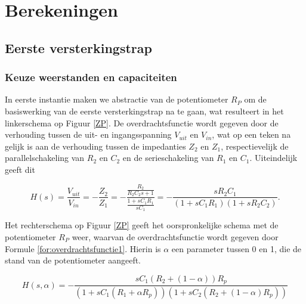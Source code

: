 \documentclass{report}
\begin{document}
\chapter{Berekeningen}
\label{berek}
\section{Eerste versterkingstrap}

\subsection{Keuze weerstanden en capaciteiten}

In eerste instantie maken we abstractie van de potentiometer $R_P$ om de basiswerking van de eerste versterkingstrap na te gaan, wat resulteert in het linkerschema op Figuur \ref{ZP}. De overdrachtsfunctie wordt gegeven door de verhouding tussen de uit- en ingangsspanning $V_{uit}$ en $V_{in}$, wat op een teken na gelijk is aan de verhouding tussen de impedanties $Z_2$ en $Z_1$,  respectievelijk de parallelschakeling van $R_2$ en $C_2$ en de serieschakeling van $R_1$ en $C_1$. Uiteindelijk geeft dit



\begin{equation}
    H(s) = \frac{V_{uit}}{V_{in}}= -\frac{Z_2}{Z_1} = -\frac{\frac{R_2}{R_2C_2s+1}}{\frac{1+sC_1R_1}{sC_1}} = - \frac{sR_2C_1}{(1+sC_1R_1)(1+sR_2C_2)}.
    \label{for:overdrachtsfunctie}
\end{equation}

Het rechterschema op Figuur \ref{ZP} geeft het oorspronkelijke schema met de potentiometer $R_P$ weer, waarvan
de overdrachtsfunctie wordt gegeven door Formule \ref{for:overdrachtsfunctie1}. Hierin is $\alpha$ een parameter tussen 0 en 1, die de stand van de potentiometer aangeeft.




\begin{equation}
    H(s,\alpha) = -\frac{sC_1(R_2+(1-\alpha))R_p}{(1+sC_1(R_1+\alpha R_p))(1+sC_2(R_2+(1-\alpha)R_p))}
    \label{for:overdrachtsfunctie1}
\end{equation}
\end{document}
